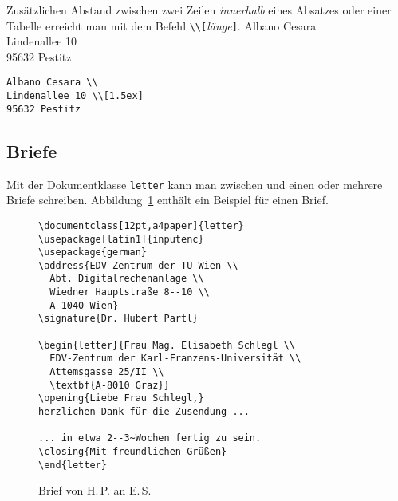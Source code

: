 Zusätzlichen Abstand zwischen zwei Zeilen \emph{innerhalb}
eines Absatzes oder einer Tabelle erreicht man mit dem Befehl
\verb|\\[|\textit{länge}\verb|]|.
\exa
Albano Cesara \\
Lindenallee 10 \\[1.5ex]
95632 Pestitz
\exb
\begin{verbatim}
Albano Cesara \\
Lindenallee 10 \\[1.5ex]
95632 Pestitz
\end{verbatim}
\exc

\smallskip
 
 
\subsection{Briefe}\label{briefe}
 
Mit der Dokumentklasse \texttt{letter} kann man zwischen
\verb|| und \verb|| einen oder
mehrere Briefe schreiben. 
Abbildung~\ref{brief} enthält ein Beispiel für einen Brief.

\begin{figure}[ht] %
\begin{lminipage}{11cm}
\begin{verbatim}
\documentclass[12pt,a4paper]{letter}
\usepackage[latin1]{inputenc}
\usepackage{german}
\address{EDV-Zentrum der TU Wien \\
  Abt. Digitalrechenanlage \\
  Wiedner Hauptstraße 8--10 \\
  A-1040 Wien}
\signature{Dr. Hubert Partl}

\begin{letter}{Frau Mag. Elisabeth Schlegl \\
  EDV-Zentrum der Karl-Franzens-Universität \\
  Attemsgasse 25/II \\
  \textbf{A-8010 Graz}}
\opening{Liebe Frau Schlegl,}
herzlichen Dank für die Zusendung ...

... in etwa 2--3~Wochen fertig zu sein.
\closing{Mit freundlichen Grüßen}
\end{letter}

\end{verbatim}
\end{lminipage}
\caption{Brief von H.\,P. an E.\,S.} \label{brief}
\end{figure}

